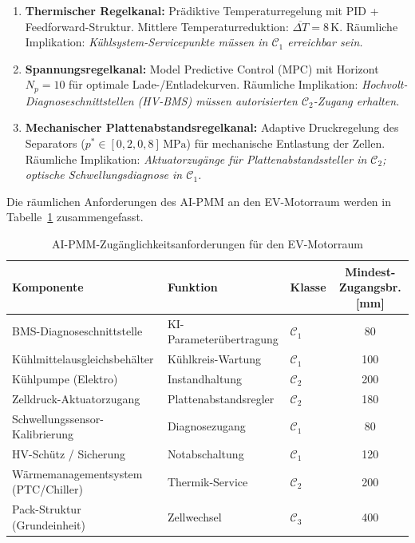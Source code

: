 ﻿\documentclass[12pt,a4paper]{article}
\begin{document}
\begin{enumerate}[leftmargin=*, label=(\Roman*)]
	\item \textbf{Thermischer Regelkanal:} Prädiktive Temperaturregelung mit
	PID + Feedforward-Struktur. Mittlere Temperaturreduktion:
	$\overline{\Delta T} = 8\,\mathrm{K}$.
	Räumliche Implikation: \textit{Kühl\-system-Servicepunkte müssen in $\mathcal{C}_1$
	erreichbar sein.}

	\item \textbf{Spannungsregelkanal:} Model Predictive Control (MPC) mit
	Horizont $N_p = 10$ für optimale Lade-/Entladekurven.
	Räumliche Implikation: \textit{Hochvolt-Diagnoseschnitt\-stellen (HV-BMS)
	müssen autorisierten $\mathcal{C}_2$-Zugang erhalten.}

	\item \textbf{Mechanischer Plattenabstandsregelkanal:} Adaptive Druckregelung
	des Separators ($p^* \in [0{,}2, 0{,}8]\,\mathrm{MPa}$) für mechanische
	Entlastung der Zellen. Räumliche Implikation: \textit{Aktuatorzugänge für
	Plattenabstandssteller in $\mathcal{C}_2$; optische Schwellungsdiagnose in $\mathcal{C}_1$.}
\end{enumerate}

Die räumlichen Anforderungen des AI-PMM an den EV-Motorraum werden in
Tabelle~\ref{tab:aipmm_anforderungen} zusammengefasst.

\begin{table}
	\centering
	\caption{AI-PMM-Zugänglichkeitsanforderungen für den EV-Motorraum}
	\label{tab:aipmm_anforderungen}
	\begin{tabular}{lllc}
		\toprule
		\textbf{Komponente} & \textbf{Funktion} & \textbf{Klasse} & \textbf{Mindest-Zugangsbr. [mm]} \\
		\midrule
		BMS-Diagnoseschnittstelle & KI-Parameterübertragung & $\mathcal{C}_1$ & 80 \\
		Kühlmittelausgleichsbehälter & Kühlkreis-Wartung & $\mathcal{C}_1$ & 100 \\
		Kühlpumpe (Elektro) & Instandhaltung & $\mathcal{C}_2$ & 200 \\
		Zelldruck-Aktuatorzugang & Plattenabstandsregler & $\mathcal{C}_2$ & 180 \\
		Schwellungssensor-Kalibrierung & Diagnosezugang & $\mathcal{C}_1$ & 80 \\
		HV-Schütz / Sicherung & Notabschaltung & $\mathcal{C}_1$ & 120 \\
		Wärmemanagementsystem (PTC/Chiller) & Thermik-Service & $\mathcal{C}_2$ & 200 \\
		Pack-Struktur (Grundeinheit) & Zellwechsel & $\mathcal{C}_3$ & 400 \\
		\bottomrule
	\end{tabular}
\end{table}
\end{document}
